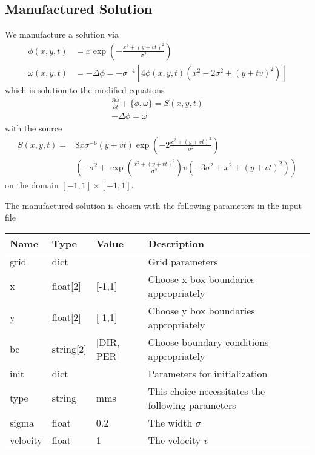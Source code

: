 \subsection{Manufactured Solution}
We manufacture a solution via
\begin{align}
    \phi(x,y,t) &=
    x \exp\left( - \frac{ x^2 + (y+vt)^2}{\sigma^2}\right) \\
    \omega(x,y,t) &= -\Delta \phi = -\sigma^{-4} \left[ 4\phi(x,y,t) ( x^2-2\sigma^2  + (y+tv)^2)\right]
\end{align}
which is solution to the modified equations
\begin{subequations}
\begin{align}
    \frac{\partial \omega}{\partial t} + \{ \phi, \omega\} = S(x,y,t) \\
    -\Delta \phi = \omega
\end{align}
\label{eq:euler_poisson_modified}
\end{subequations}
with the source
\begin{align}
    S(x,y,t) =& 8 x \sigma^{-6}(y+vt)\exp\left( - 2\frac{ x^2 + (y+vt)^2}{\sigma^2} \right) \nonumber\\
    &\left(-\sigma^2  + \exp\left( \frac{ x^2 + (y+vt)^2}{\sigma^2} \right) v( -3\sigma^2 + x^2 + (y+vt)^2) \right)
\end{align}
on the domain $[-1,1]\times [-1,1]$.

The manufactured solution is chosen with the following parameters in the input file
\begin{longtable}{llll}
\toprule
\rowcolor{gray!50}\textbf{Name} &  \textbf{Type} & \textbf{Value}  & \textbf{Description}  \\ \midrule
grid & dict &  & Grid parameters \\
\qquad x & float[2]& [-1,1] & Choose x box boundaries appropriately \\
\qquad y & float[2]& [-1,1] & Choose y box boundaries appropriately \\
\qquad bc & string[2] & [DIR, PER] & Choose boundary conditions appropriately \\
init &  dict &   & Parameters for initialization \\
\qquad type      & string & mms & This choice necessitates the following parameters \\
\qquad sigma      & float & 0.2 & The width $\sigma$ \\
\qquad velocity   & float & 1 & The velocity $v$ \\
\bottomrule
\end{longtable}
